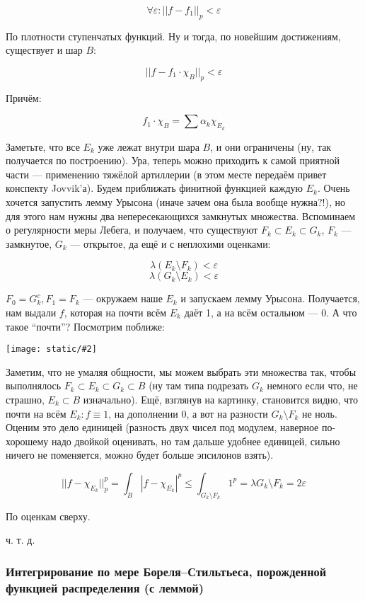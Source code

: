 \documentclass{article}
\def\images#1#2{\begin{center}\texttt{[image: static/\#2]}\end{center}}
\begin{document}
\[\forall \varepsilon: ||f - f_1||_p < \varepsilon\]

По плотности ступенчатых функций. Ну и тогда, по новейшим достижениям, существует и шар $B$:

\[||f - f_1 \cdot \chi_{B}||_p < \varepsilon\]

Причём:

\[f_1 \cdot \chi_{B} = \sum \alpha_k \chi_{E_k}\]

Заметьте, что все $E_k$ уже лежат внутри шара $B$, и они ограничены (ну, так получается по построению). Ура, теперь можно приходить к самой приятной части --- применению тяжёлой артиллерии (в этом месте передаём привет конспекту Jovvik'а). Будем приближать финитной функцией каждую $E_k$. Очень хочется запустить лемму Урысона (иначе зачем она была вообще нужна?!), но для этого нам нужны два непересекающихся замкнутых множества. Вспоминаем о регулярности меры Лебега, и получаем, что существуют $F_k \subset E_k \subset G_k$, $F_k$ --- замкнутое, $G_k$ --- открытое, да ещё и с неплохими оценками:

\[\lambda (E_k \setminus F_k) < \varepsilon\]
\[\lambda (G_k \setminus E_k) < \varepsilon\]

$F_0 = G_k^c, F_1 = F_k$ --- окружаем наше $E_k$ и запускаем лемму Урысона. Получается, нам выдали $f$, которая на почти всём $E_k$ даёт 1, а на всём остальном --- 0. А что такое ``почти''? Посмотрим поближе:

\images{0.3}{pl_fin.jpg}

Заметим, что не умаляя общности, мы можем выбрать эти множества так, чтобы выполнялось $F_k \subset E_k \subset G_k \subset B$ (ну там типа подрезать $G_k$ немного если что, не страшно, $E_k \subset B$ изначально). Ещё, взглянув на картинку, становится видно, что почти на всём $E_k: f \equiv 1$, на дополнении 0, а вот на разности $G_k \setminus F_k$ не ноль. Оценим это дело единицей (разность двух чисел под модулем, наверное по-хорошему надо двойкой оценивать, но там дальше удобнее единицей, сильно ничего не поменяется, можно будет больше эпсилонов взять).

\[||f - \chi_{E_k}||_p^p = \int_{B} |f - \chi_{E_k}|^p \le \int_{G_k \setminus F_k} 1^p = \lambda G_k \setminus F_k = 2 \varepsilon\]

По оценкам сверху.

ч. т. д. 

\subsubsection{Интегрирование по мере Бореля--Стильтьеса, порожденной функцией распределения (с леммой)}
\end{document}
